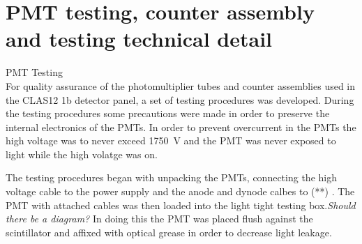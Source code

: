 \section{PMT testing, counter assembly and testing technical detail}


PMT Testing\\




For quality assurance of the photomultiplier tubes and counter assemblies used in the CLAS12 1b detector panel, a set of testing procedures was developed.  During the testing procedures some precautions were made in order to preserve the internal electronics of the PMTs.  In order to prevent overcurrent in the PMTs the high voltage was to never exceed \SI{1750}{V} and the PMT was never exposed to light while the high volatge was on.

The testing procedures began with unpacking the PMTs, connecting the high voltage cable to the power supply and the anode and dynode calbes to {\color{red}(**)} .  The PMT with attached cables was then loaded into the light tight testing box.\textit{\color{blue}Should there be a diagram?} In doing this the PMT was placed flush against the scintillator and affixed with optical grease in order to decrease light leakage.

